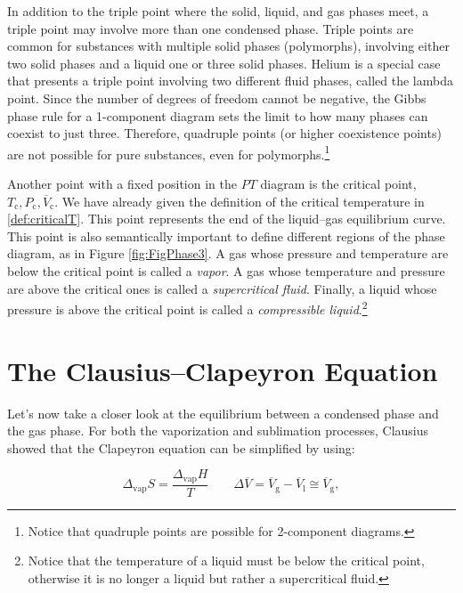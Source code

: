 \documentclass[
  9pt,
]{extbook}
\theoremstyle{definition}
\theoremstyle{definition}
\theoremstyle{definition}
\theoremstyle{definition}
\theoremstyle{remark}
\begin{document}
In addition to the triple point where the solid, liquid, and gas phases meet, a triple point may involve more than one condensed phase. Triple points are common for substances with multiple solid phases (polymorphs), involving either two solid phases and a liquid one or three solid phases. Helium is a special case that presents a triple point involving two different fluid phases, called the lambda point. Since the number of degrees of freedom cannot be negative, the Gibbs phase rule for a 1-component diagram sets the limit to how many phases can coexist to just three. Therefore, quadruple points (or higher coexistence points) are not possible for pure substances, even for polymorphs.\footnote{Notice that quadruple points are possible for 2-component diagrams.}

Another point with a fixed position in the \(PT\) diagram is the critical point, \({T_{\text{c}},P_{\text{c}},\overline{V}_{\text{c}}}\). We have already given the definition of the critical temperature in \ref{def:criticalT}. This point represents the end of the liquid--gas equilibrium curve. This point is also semantically important to define different regions of the phase diagram, as in Figure \ref{fig:FigPhase3}. A gas whose pressure and temperature are below the critical point is called a \emph{vapor}. A gas whose temperature and pressure are above the critical ones is called a \emph{supercritical fluid}. Finally, a liquid whose pressure is above the critical point is called a \emph{compressible liquid}.\footnote{Notice that the temperature of a liquid must be below the critical point, otherwise it is no longer a liquid but rather a supercritical fluid.}

\section{The Clausius--Clapeyron Equation}\label{the-clausiusclapeyron-equation}

Let's now take a closer look at the equilibrium between a condensed phase and the gas phase. For both the vaporization and sublimation processes, Clausius showed that the Clapeyron equation can be simplified by using:

\begin{equation}
 \Delta_{\text{vap}} S = \frac{\Delta_{\text{vap}} H}{T} \qquad \Delta \overline{V}= \overline{V}_{\mathrm{g}} -\overline{V}_{\mathrm{l}} \cong \overline{V}_{\mathrm{g}},
\label{eq:clacla1}
\end{equation}
\end{document}

